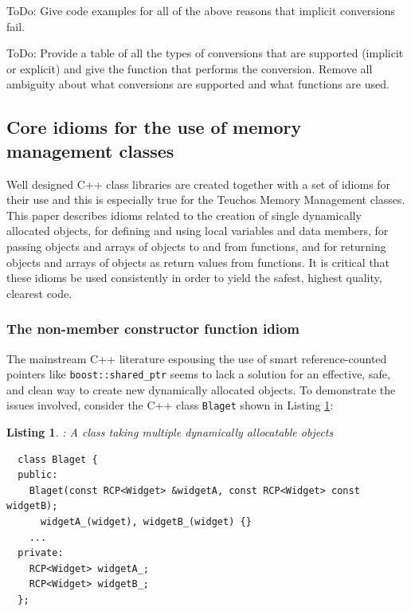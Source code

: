 \documentclass[pdf,ps2pdf,11pt]{SANDreport}
\newtheorem{listing}{Listing}
\begin{document}
ToDo: Give code examples for all of the above reasons that implicit
conversions fail.

ToDo: Provide a table of all the types of conversions that are
supported (implicit or explicit) and give the function that performs
the conversion.  Remove all ambiguity about what conversions are
supported and what functions are used.

%
{}\subsection{Core idioms for the use of memory management classes}
\label{sec:idioms}
%

Well designed C++ class libraries are created together with a set of
idioms for their use and this is especially true for the Teuchos
Memory Management classes.  This paper describes idioms related to the
creation of single dynamically allocated objects, for defining and
using local variables and data members, for passing objects and arrays
of objects to and from functions, and for returning objects and arrays
of objects as return values from functions.  It is critical that these
idioms be used consistently in order to yield the safest, highest
quality, clearest code.


%
{}\subsubsection{The non-member constructor function idiom}
\label{sec:nonmember-constructor-idiom}
%

The mainstream C++ literature espousing the use of smart
reference-counted pointers like {}\texttt{boost::shared\_ptr} seems to
lack a solution for an effective, safe, and clean way to create new
dynamically allocated objects.  To demonstrate the issues involved,
consider the C++ class {}\texttt{Blaget} shown in Listing
{}\ref{listing:BlagetClass}:

\begin{listing}: A class taking multiple dynamically allocatable objects \\
\label{listing:BlagetClass}
{\small\begin{verbatim}
  class Blaget {
  public:
    Blaget(const RCP<Widget> &widgetA, const RCP<Widget> const widgetB);
      widgetA_(widget), widgetB_(widget) {}
    ...
  private:
    RCP<Widget> widgetA_;
    RCP<Widget> widgetB_;
  };
\end{verbatim}}
\end{listing}
\end{document}
